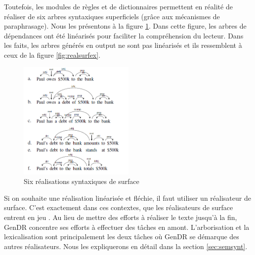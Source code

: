 Toutefois, les modules de règles et de dictionnaires permettent en réalité de réaliser de six arbres syntaxiques superficiels (grâce aux mécanismes de paraphrasage). Nous les présentons à la figure \ref{fig:6realsurf}. Dans cette figure, les arbres de dépendances ont été linéarisés pour faciliter la compréhension du lecteur. Dans les faits, les arbres générés en output ne sont pas linéarisés et ils ressemblent à ceux de la figure \ref{fig:realsurfex}.

\begin{figure}[htb]
	\centering
	\includegraphics[width=0.5\textwidth, trim = {0cm 0cm 0cm 0cm},clip]{ch3/figs/exemples_real.png}
	\caption{Six réalisations syntaxiques de surface \citep{lareau18}}
	\label{fig:6realsurf}
\end{figure}

Si on souhaite une réalisation linéarisée et fléchie,  il faut utiliser un réalisateur de surface. C'est exactement dans ces contextes, que les réalisateurs de surface entrent en jeu \citep{DaoustJSREALTextRealizer2015, MolinsJSrealBBilingualText2015, GattSimpleNLGRealisationEngine2009, MilleSharedTaskProposal2017a,BelzFirstSurfaceRealisation2011} . Au lieu de mettre des efforts à réaliser le texte jusqu'à la fin, GenDR concentre ses efforts à effectuer des tâches en amont. L'arborisation et la lexicalisation sont principalement les deux tâches où GenDR se démarque des autres réalisateurs. Nous les expliquerons en détail dans la section \ref{sec:semsynt}.


